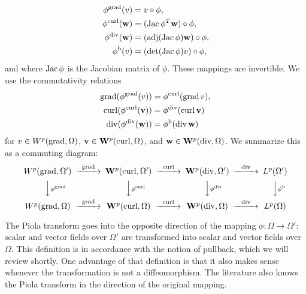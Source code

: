\documentclass[12pt,a4paper]{article}
\begin{document}
\begin{subequations}\label{eq_definition_piola}
\begin{align}
    \phi^{\operatorname{grad}}(v) &= v \circ \phi, \\
    \phi^{\operatorname{curl}}({\mathbf w}) &= (\operatorname{{\rm Jac}}\phi^{T} {\mathbf w}) \circ \phi, \\
    \phi^{\operatorname{div}}({\mathbf w}) &= \left( \operatorname{adj}(\operatorname{{\rm Jac}}\phi) {\mathbf w} \right)  \circ \phi, \\
    \phi^{\rm b}(v) &= \left( \det(\operatorname{{\rm Jac}}\phi) v \right)  \circ \phi,
\end{align}
\end{subequations}
and where $\operatorname{{\rm Jac}}\phi$ is the Jacobian matrix of $\phi$. 
These mappings are invertible. 
%
%
We use the commutativity relations 
\begin{subequations}\label{eq_piola_commute}
\begin{align}
    \operatorname{grad} (\phi^{\operatorname{grad}} (v)) &= \phi^{\operatorname{curl}}(\operatorname{grad} v), 
    \\
    \operatorname{curl} (\phi^{\operatorname{curl}}({\mathbf v})) &= \phi^{\operatorname{div}}(\operatorname{curl} {\mathbf v}) 
    \\
    \operatorname{div} (\phi^{\operatorname{div}}({\mathbf w})) &= \phi^{\rm b}(\operatorname{div} {\mathbf w})
\end{align}
\end{subequations}
for $v \in W^{p}(\operatorname{grad},\Omega)$, ${\mathbf v} \in {\mathbf W}^{p}(\operatorname{curl},\Omega)$, and ${\mathbf w} \in {\mathbf W}^{p}(\operatorname{div},\Omega)$.  
We summarize this as a commuting diagram:
\begin{align*}
    \begin{CD}
        W^{p}(\grad,\Omega') @>{\grad}>> \bfW^{p}(\curl,\Omega') @>{\curl}>> \bfW^{p}(\divergence,\Omega') @>{\divergence}>> L^{p}(\Omega')
        \\
        @VV{\phi^{\grad}}V 
        @VV{\phi^{\curl}}V 
        @VV{\phi^{\divergence}}V 
        @VV{\phi^{\rm b}}V 
        \\
        W^{p}(\grad,\Omega ) @>{\grad}>> \bfW^{p}(\curl,\Omega ) @>{\curl}>> \bfW^{p}(\divergence,\Omega ) @>{\divergence}>> L^{p}(\Omega )
    \end{CD}
\end{align*}

\begin{remark}
    The Piola transform goes into the opposite direction of the mapping $\phi : \Omega \rightarrow \Omega'$:
    scalar and vector fields over $\Omega'$ are transformed into scalar and vector fields over $\Omega$.
    This definition is in accordance with the notion of pullback, which we will review shortly. 
    One advantage of that definition is that it also makes sense whenever the transformation is not a diffeomorphism. 
    The literature also knows the Piola transform in the direction of the original mapping. 
\end{remark}
\end{document}
